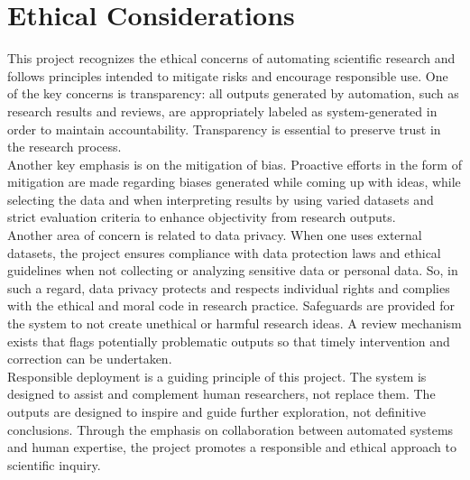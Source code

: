 \section{Ethical Considerations}
This project recognizes the ethical concerns of automating scientific research and follows principles intended to mitigate risks and encourage responsible use. One of the key concerns is transparency: all outputs generated by automation, such as research results and reviews, are appropriately labeled as system-generated in order to maintain accountability. Transparency is essential to preserve trust in the research process.\\Another key emphasis is on the mitigation of bias. Proactive efforts in the form of mitigation are made regarding biases generated while coming up with ideas, while selecting the data and when interpreting results by using varied datasets and strict evaluation criteria to enhance objectivity from research outputs.\\Another area of concern is related to data privacy. When one uses external datasets, the project ensures compliance with data protection laws and ethical guidelines when not collecting or analyzing sensitive data or personal data. So, in such a regard, data privacy protects and respects individual rights and complies with the ethical and moral code in research practice. Safeguards are provided for the system to not create unethical or harmful research ideas. A review mechanism exists that flags potentially problematic outputs so that timely intervention and correction can be undertaken.\\Responsible deployment is a guiding principle of this project. The system is designed to assist and complement human researchers, not replace them. The outputs are designed to inspire and guide further exploration, not definitive conclusions. Through the emphasis on collaboration between automated systems and human expertise, the project promotes a responsible and ethical approach to scientific inquiry.

